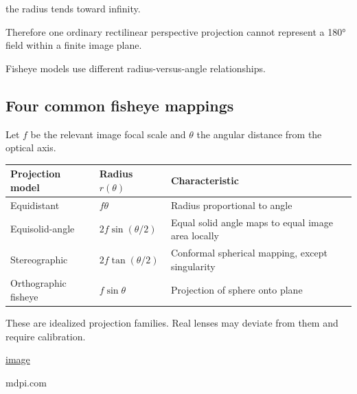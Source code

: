 the radius tends toward infinity.

Therefore one ordinary rectilinear perspective projection cannot represent a 180° field within a finite image plane.

Fisheye models use different radius-versus-angle relationships.

\subsection{Four common fisheye mappings}\label{02-foundations-ii-ch035-four-common-fisheye-mappings}

Let \(f\) be the relevant image focal scale and \(\theta\) the angular distance from the optical axis.

{\def\LTcaptype{none} %
\begin{longtable}[]{@{}
  >{\raggedright\arraybackslash}p{}
  >{\raggedright\arraybackslash}p{}
  >{\raggedright\arraybackslash}p{}@{}}
\toprule\noalign{}
\begin{minipage}[b]{\linewidth}\raggedright
Projection model
\end{minipage} & \begin{minipage}[b]{\linewidth}\raggedright
Radius \(r(\theta)\)
\end{minipage} & \begin{minipage}[b]{\linewidth}\raggedright
Characteristic
\end{minipage} \\
\midrule\noalign{}
\endhead
\bottomrule\noalign{}
\endlastfoot
Equidistant & \(f\theta\) & Radius proportional to angle \\
Equisolid-angle & \(2f\sin(\theta/2)\) & Equal solid angle maps to equal image area locally \\
Stereographic & \(2f\tan(\theta/2)\) & Conformal spherical mapping, except singularity \\
Orthographic fisheye & \(f\sin\theta\) & Projection of sphere onto plane \\
\end{longtable}
}

These are idealized projection families. Real lenses may deviate from them and require calibration. 

\href{https://www.google.com/s2/favicons?domain=https://www.mdpi.com&sz=32}{image}

mdpi.com

